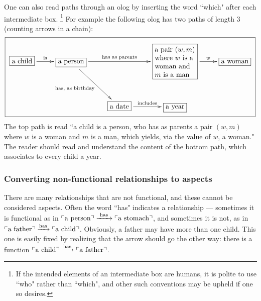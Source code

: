 \documentclass{book}
\def\tn{\textnormal}
\def\rr{\raggedright}
\newcommand{\LA}[2]{\ar[#1]^-{\tn {#2}}}
\newcommand{\LAL}[2]{\ar[#1]_-{\tn {#2}}}
\newcommand{\obox}[3]{\stackrel{#1}{\fbox{\parbox{#2}{#3}}}}
\newcommand{\fakebox}[1]{\tn{$\ulcorner$#1$\urcorner$}}
\newcommand{\To}[1]{\xrightarrow{#1}}
\theoremstyle{remark}
\theoremstyle{definition}
\begin{document}
One can also read paths through an olog by inserting the word ``which" after each intermediate box.
\footnote{If the intended elements of an intermediate box are humans, it is polite to use ``who" rather than ``which", and other such conventions may be upheld if one so desires.}
For example the following olog has two paths of length 3 (counting arrows in a chain): \small\begin{align}\label{olog:paths}\fbox{\xymatrixnocompile{\fbox{a child}\LA{r}{is}&\fbox{a person}\LA{rr}{has as parents}\LAL{dr}{has, as birthday}&&\obox{}{.8in}{\rr a pair $(w,m)$ where $w$ is a woman and $m$ is a man}\LA{r}{$w$}&\fbox{a woman}\\&&\fbox{a date}\LA{r}{includes}&\fbox{a year}}}\end{align}  \normalsize The top path is read ``a child is a person, who has as parents a pair $(w,m)$ where $w$ is a woman and $m$ is a man, which yields, via the value of $w$, a woman."  The reader should read and understand the content of the bottom path, which associates to every child a year.  



\subsubsection{Converting non-functional relationships to aspects}\label{sec:relations}

There are many relationships that are not functional, and these cannot be considered aspects.  Often the word ``has" indicates a relationship --- sometimes it is functional as in $\fakebox{a person}\To{\tn{ has }}\fakebox{a stomach}$, and sometimes it is not, as in $\fakebox{a father}\To{\tn{has}}\fakebox{a child}$. Obviously, a father may have more than one child. This one is easily fixed by realizing that the arrow should go the other way: there is a function $\fakebox{a child}\To{\tn{has}}\fakebox{a father}$. 
\end{document}
